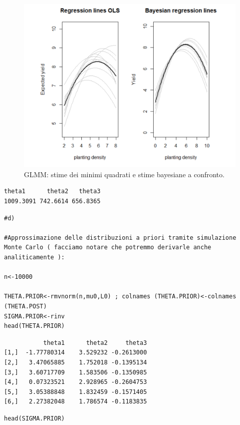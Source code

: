 \begin{figure}
    \centering
    \includegraphics[totalheight=8cm]{img/esercizio11-2-2.png}
    \caption{ GLMM: stime dei minimi quadrati e stime bayesiane a confronto.}
\end{figure}
\newpage
{
\color{red}
\begin{Verbatim}
theta1      theta2   theta3
1009.3091 742.6614 656.8365
\end{Verbatim}
}

\begin{lstlisting}[style=R]
#d)

#Approssimazione delle distribuzioni a priori tramite simulazione Monte Carlo ( facciamo notare che potremmo derivarle anche analiticamente ):

n<-10000

THETA.PRIOR<-rmvnorm(n,mu0,L0) ; colnames (THETA.PRIOR)<-colnames (THETA.POST)
SIGMA.PRIOR<-rinv
head(THETA.PRIOR)
\end{lstlisting}

\newpage
{
\color{red}
\begin{Verbatim}
           theta1      theta2     theta3
[1,]  -1.77780314    3.529232 -0.2613000
[2,]   3.47065885    1.752018 -0.1395134
[3,]   3.60717709    1.583506 -0.1350985
[4,]   0.07323521    2.928965 -0.2604753
[5,]   3.05388848    1.832459 -0.1571405
[6,]   2.27382048    1.786574 -0.1183835
\end{Verbatim}
}

\begin{lstlisting}[style=R]
head(SIGMA.PRIOR)
\end{lstlisting}

